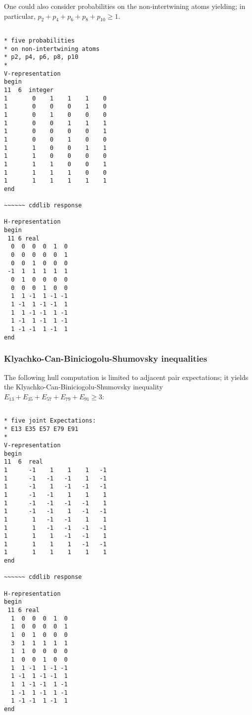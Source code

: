 \documentclass[%
  twocolumn,
 showpacs,
 showkeys,
 preprintnumbers,
 amsmath,amssymb,
 aps,
  pra,
  longbibliography,
 floatfix,
 ]{revtex4-1}
\begin{document}
One could also consider probabilities on the non-intertwining atoms yielding; in particular,
$p_2+p_4+p_6+p_8+p_{10} \ge 1$.

{ \begin{lstlisting}[backgroundcolor=\color{yellow!10},framerule=0pt,breaklines=true, frame=tb]

* five probabilities
* on non-intertwining atoms
* p2, p4, p6, p8, p10
*
V-representation
begin
11  6  integer
1       0    1    1    1    0
1       0    0    0    1    0
1       0    1    0    0    0
1       0    0    1    1    1
1       0    0    0    0    1
1       0    0    1    0    0
1       1    0    0    1    1
1       1    0    0    0    0
1       1    1    0    0    1
1       1    1    1    0    0
1       1    1    1    1    1
end

~~~~~~ cddlib response

H-representation
begin
 11 6 real
  0  0  0  0  1  0
  0  0  0  0  0  1
  0  0  1  0  0  0
 -1  1  1  1  1  1
  0  1  0  0  0  0
  0  0  0  1  0  0
  1  1 -1  1 -1 -1
  1 -1  1 -1 -1  1
  1  1 -1 -1  1 -1
  1 -1  1 -1  1 -1
  1 -1 -1  1 -1  1
end

\end{lstlisting}  }




\subsubsection{Klyachko-Can-Biniciogolu-Shumovsky inequalities}
\label{2017-b-kcbsia}


The following hull computation is limited to adjacent pair expectations;
it yields the Klyachko-Can-Biniciogolu-Shumovsky inequality
$  E_{13}  + E_{35}  + E_{57}  + E_{79}  + E_{91}   \ge 3   $:

{ \begin{lstlisting}[backgroundcolor=\color{yellow!10},framerule=0pt,breaklines=true, frame=tb]

* five joint Expectations:
* E13 E35 E57 E79 E91
*
V-representation
begin
11  6  real
1      -1    1    1    1   -1
1      -1   -1   -1    1   -1
1      -1    1   -1   -1   -1
1      -1   -1    1    1    1
1      -1   -1   -1   -1    1
1      -1   -1    1   -1   -1
1       1   -1   -1    1    1
1       1   -1   -1   -1   -1
1       1    1   -1   -1    1
1       1    1    1   -1   -1
1       1    1    1    1    1
end

~~~~~~ cddlib response

H-representation
begin
 11 6 real
  1  0  0  0  1  0
  1  0  0  0  0  1
  1  0  1  0  0  0
  3  1  1  1  1  1
  1  1  0  0  0  0
  1  0  0  1  0  0
  1  1 -1  1 -1 -1
  1 -1  1 -1 -1  1
  1  1 -1 -1  1 -1
  1 -1  1 -1  1 -1
  1 -1 -1  1 -1  1
end

\end{lstlisting}  }
\end{document}

